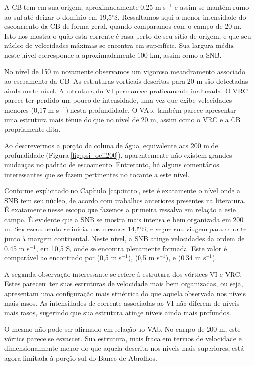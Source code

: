 A CB tem em sua origem, aproximadamente 0,25 m s$^{-1}$ e assim se mantém rumo ao sul até 
deixar o domínio em 19,5$^\circ$S. Ressaltamos aqui a menor intensidade do escoamento
da CB de forma geral, quando comparamos com o campo de 20 m. Isto nos mostra o quão
esta corrente é rasa perto de seu sítio de origem, e que seu núcleo de velocidades máximas se encontra
em superfície. Sua largura média neste nível corresponde a aproximadamente 100 km, assim como a SNB. 

No nível de 150 m novamente observamos um vigoroso meandramento associado ao escoamento da CB. As estruturas
vorticais descritas para 20 m são detectadas ainda neste nível. A estrutura do VI permanece praticamente 
inalterada. O VRC parece ter perdido um pouco de intensidade, uma vez que exibe velocidades menores (0,17 m s$^{-1}$)
nesta profundidade. O VAb, também parece apresentar uma estrutura mais tênue do que
no nível de 20 m, assim como o VRC e a CB propriamente dita. 

Ao descrevermos a porção da coluna de água, equivalente aos 200 m de profundidade (Figura \ref{fig:psi_oeii200}), aparentemente
não existem grandes mudanças no padrão de escoamento. Entretanto, há alguns comentários 
interessantes que se fazem pertinentes no tocante a este nível. 

Conforme explicitado no Capítulo \ref{cap:intro}, este é exatamente o nível onde a SNB tem seu 
núcleo, de acordo com trabalhos anteriores presentes na literatura. É exatamente nesse escopo
que fazemos a primeira ressalva em relação a este campo. É evidente que a SNB se mostra mais 
intensa e bem organizada em 200 m. Seu escoamento se inicia nos mesmos 14,5$^\circ$S, e
segue sua viagem para o norte junto à margem continental. Neste nível, a SNB atinge velocidades
da ordem de 0,45 m s$^{-1}$, em 10,5$^\circ$S, onde se encontra plenamente formada.
Este valor é comparável ao encontrado por \cite{silveira_etal1994} (0,5 m s$^{-1}$),
 \cite{stramma_etal1995} (0,5 m s$^{-1}$), e \cite{soutelino2005} (0,34 m s$^{-1}$). 

A segunda observação interessante se refere à estrutura dos vórtices VI e VRC. Estes parecem 
ter suas estruturas de velocidade mais bem organizadas, ou seja, apresentam uma configuração mais simétrica
do que aquela observada nos níveis mais rasos. As intensidades de corrente
associadas ao VI não diferem de níveis mais rasos, sugerindo que sua estrutura 
atinge níveis ainda mais profundos.  

O mesmo não pode ser afirmado em relação ao VAb. No campo de 200 m, este vórtice parece se 
 esvaecer. Sua estrutura, mais fraca em termos de velocidade e dimensionalmente
menor do que aquela descrita nos níveis mais superiores, está agora limitada à porção 
sul do Banco de Abrolhos.  

